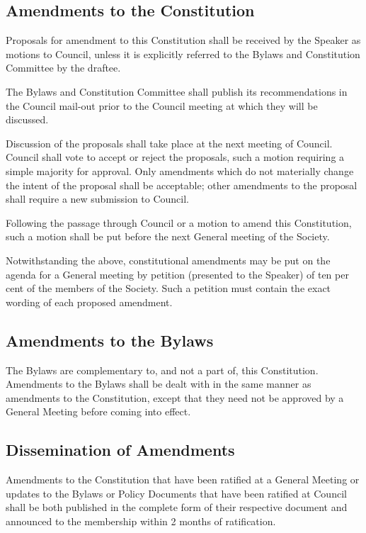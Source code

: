 \subsection {Amendments to the Constitution}
	\begin{longenum}[label*=\arabic*., align=left]
	\item Proposals for amendment to this Constitution shall be received by the Speaker as motions to Council, unless it is explicitly referred to the Bylaws and Constitution Committee by the draftee.
    \item The Bylaws and Constitution Committee shall publish its recommendations in the Council mail-out prior to the Council meeting at which they will be discussed.
    \item Discussion of the proposals shall take place at the next meeting of Council. Council shall vote to accept or reject the proposals, such a motion requiring a simple majority for approval. Only amendments which do not materially change the intent of the proposal shall be acceptable; other amendments to the proposal shall require a new submission to Council.
    \item Following the passage through Council or a motion to amend this Constitution, such a motion shall be put before the next General meeting of the Society. 
    \item Notwithstanding the above, constitutional amendments may be put on the agenda for a General meeting by petition (presented to the Speaker) of ten per cent of the members of the Society. Such a petition must contain the exact wording of each proposed amendment.
\end{longenum}
\subsection {Amendments to the Bylaws}
	\begin{longenum}[label*=\arabic*., align=left]
	\item The Bylaws are complementary to, and not a part of, this Constitution. Amendments to the Bylaws shall be dealt with in the same manner as amendments to the Constitution, except that they need not be approved by a General Meeting before coming into effect.
\end{longenum}
\subsection{Dissemination of Amendments}
	\begin{longenum}[label*=\arabic*., align=left]
	\item Amendments to the Constitution that have been ratified at a General Meeting or updates to the Bylaws or Policy Documents that have been ratified at Council shall be both published in the complete form of their respective document and announced to the membership within 2 months of ratification.
\end{longenum}
\newpage

